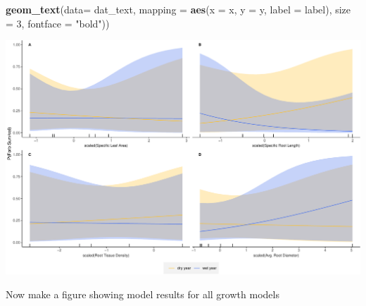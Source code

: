 \documentclass[
]{article}
\newenvironment{Shaded}{\begin{snugshade}}{\end{snugshade}}
\newcommand{\DataTypeTok}[1]{\textcolor[rgb]{0.13,0.29,0.53}{#1}}
\newcommand{\DecValTok}[1]{\textcolor[rgb]{0.00,0.00,0.81}{#1}}
\newcommand{\KeywordTok}[1]{\textcolor[rgb]{0.13,0.29,0.53}{\textbf{#1}}}
\newcommand{\NormalTok}[1]{#1}
\newcommand{\StringTok}[1]{\textcolor[rgb]{0.31,0.60,0.02}{#1}}
\begin{document}
\begin{Shaded}
\begin{Highlighting}[]
\StringTok{  }\KeywordTok{geom\_text}\NormalTok{(}\DataTypeTok{data=}\NormalTok{ dat\_text, }\DataTypeTok{mapping =} \KeywordTok{aes}\NormalTok{(}\DataTypeTok{x =}\NormalTok{ x, }\DataTypeTok{y =}\NormalTok{ y, }\DataTypeTok{label =}\NormalTok{ label), }\DataTypeTok{size =} \DecValTok{3}\NormalTok{, }\DataTypeTok{fontface =} \StringTok{"bold"}\NormalTok{))}
\end{Highlighting}
\end{Shaded}

\includegraphics{figures/supForbSurvPlots-1.pdf}

Now make a figure showing model results for all growth models
\end{document}
